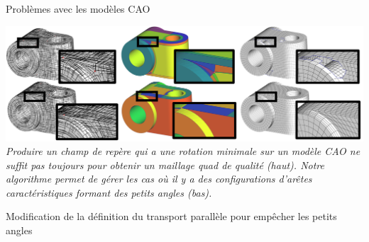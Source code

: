 \documentclass{beamer}
\begin{document}
\begin{frame}{Problèmes avec les modèles CAO}
    \begin{center}
        \includegraphics[width=0.9\linewidth]{img/cadff/teaser2}
        \small{
            \textit{Produire un champ de repère qui a une rotation minimale sur un modèle CAO ne suffit pas toujours pour obtenir un maillage quad de qualité (haut). 
            Notre algorithme permet de gérer les cas où il y a des configurations d'arêtes caractéristiques formant des petits angles (bas).}
        }
    \end{center}
\end{frame}
    

\begin{frame}{Modification de la définition du transport parallèle pour empêcher les petits angles}

    \begin{center}
    \end{center}
    
\end{frame}
    
\end{document}
